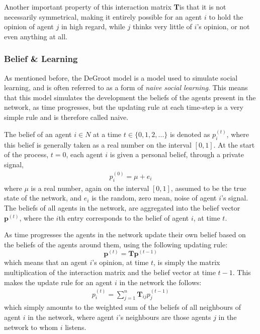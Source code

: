 \documentclass{article}
\newcommand{\T}{\textbf{T}}
\newcommand{\Tij}{\textbf{T}_{ij}}
\newcommand{\beli}[3][2]{p_{#2}^{(#3)}}
\begin{document}
Another important property of this interaction matrix \T is that it is not necessarily symmetrical, making it entirely possible for an agent $i$ to hold the opinion of agent $j$ in high regard, while $j$ thinks very little of $i$'s opinion, or not even anything  at all.

\newpage

\subsubsection{Belief \& Learning}
\label{beliefs}
As mentioned before, the DeGroot model is a model used to simulate social learning, and is often referred to as a form of \textit{naive social learning}. This means that this model simulates the development the beliefs of the agents present in the network, as time progresses, but the updating rule at each time-step is a very simple rule and is therefore called naive.

The belief of an agent $i \in N$ at a time $t \in \{0, 1, 2, ...\}$ is denoted as $p_{i}^{(t)}$, where this belief is generally taken as a real number on the interval $[0, 1]$. At the start of the process, $t=0$, each agent $i$ is given a personal belief, through a private signal,
\begin{align*}
    \beli{i}{0} = \mu + e_i
\end{align*}
where $\mu$ is a real number, again on the interval $[0, 1]$, assumed to be the true state of the network, and $e_i$ is the random, zero mean, noise of agent $i$'s signal. \newline
The beliefs of all agents in the network, are aggregated into the belief vector $\textbf{p}^{(t)}$, where the $i$th entry corresponds to the belief of agent $i$, at time $t$.

As time progresses the agents in the network update their own belief based on the beliefs of the agents around them, using the following updating rule:
\begin{equation}
    \label{updating:standard}
    \textbf{p}^{(t)} = \T\textbf{p}^{(t-1)}
\end{equation}
which means that an agent $i$'s opinion, at time $t$, is simply the matrix multiplication of the interaction matrix and the belief vector at time $t-1$. This makes the update rule for an agent $i$ in the network the follows:
\begin{align*}
    \beli{i}{t} = \sum_{j=1}^{n}\Tij\beli{j}{t-1}
\end{align*}
which simply amounts to the weighted sum of the beliefs of all neighbours of agent $i$ in the network, where agent $i$'s neighbours are those agents $j$ in the network to whom $i$ listens.
\end{document}

